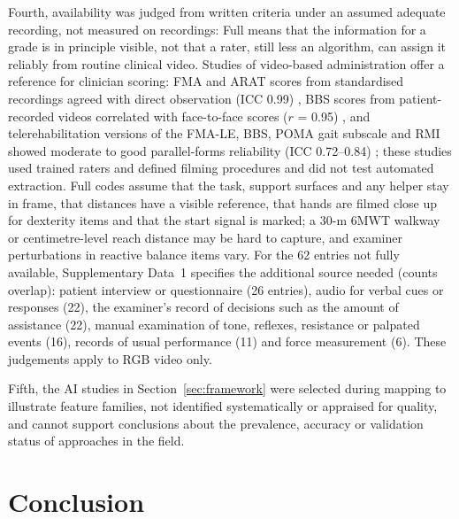 \documentclass[11pt]{article}
\begin{document}
Fourth, availability was judged from written criteria under an assumed adequate recording, not measured on recordings: Full means that the information for a grade is in principle visible, not that a rater, still less an algorithm, can assign it reliably from routine clinical video. Studies of video-based administration offer a reference for clinician scoring: FMA and ARAT scores from standardised recordings agreed with direct observation (ICC 0.99) \cite{Amano2018RemoteFMAARAT}, BBS scores from patient-recorded videos correlated with face-to-face scores ($r$ = 0.95) \cite{Onal2025TeleBBS}, and telerehabilitation versions of the FMA-LE, BBS, POMA gait subscale and RMI showed moderate to good parallel-forms reliability (ICC 0.72--0.84) \cite{Zhang2024TeleMobilityScales}; these studies used trained raters and defined filming procedures and did not test automated extraction. Full codes assume that the task, support surfaces and any helper stay in frame, that distances have a visible reference, that hands are filmed close up for dexterity items and that the start signal is marked; a 30-m 6MWT walkway or centimetre-level reach distance may be hard to capture, and examiner perturbations in reactive balance items vary. For the 62 entries not fully available, Supplementary Data~1 specifies the additional source needed (counts overlap): patient interview or questionnaire (26 entries), audio for verbal cues or responses (22), the examiner's record of decisions such as the amount of assistance (22), manual examination of tone, reflexes, resistance or palpated events (16), records of usual performance (11) and force measurement (6). These judgements apply to RGB video only.

Fifth, the AI studies in Section~\ref{sec:framework} were selected during mapping to illustrate feature families, not identified systematically or appraised for quality, and cannot support conclusions about the prevalence, accuracy or validation status of approaches in the field.

\section{Conclusion}
\end{document}
